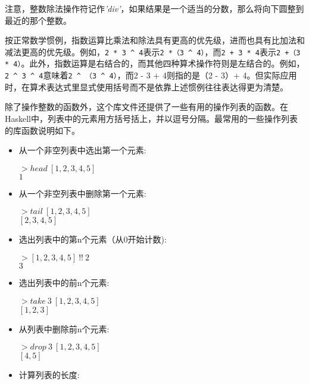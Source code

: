 注意，整数除法操作符记作\textit{'div'}，如果结果是一个适当的分数，那么将向下圆整到最近的那个整数。

按正常数学惯例，指数运算比乘法和除法具有更高的优先级，进而也具有比加法和减法更高的优先级。例如，\verb|2 * 3 ^ 4|表示\verb|2 *（3 ^ 4）|，而\verb|2 + 3 * 4|表示\verb|2 +（3 * 4）|。此外，指数运算是右结合的，而其他四种算术操作符则是左结合的。例如，\verb|2 ^ 3 ^ 4|意味着\verb|2 ^ （3 ^ 4）|，而2 - 3 + 4则指的是（2 - 3）+ 4。但实际应用时，在算术表达式里显式使用括号而不是依靠上述惯例往往表达得更为清楚。 

除了操作整数的函数外，这个库文件还提供了一些有用的操作列表的函数。在Haskell中，列表中的元素用方括号括上，并以逗号分隔。最常用的一些操作列表的库函数说明如下。

\begin{itemize}
\item 从一个非空列表中选出第一个元素:

\noindent\hspace*{1cm} $> head~[1, 2, 3, 4, 5]$\\
\hspace*{1cm} $1$

\item 从一个非空列表中删除第一个元素:

\noindent\hspace*{1cm} $> tail~[1, 2, 3, 4, 5]$\\
\hspace*{1cm} $[2, 3, 4, 5]$

\item 选出列表中的第n个元素（从0开始计数):

\noindent\hspace*{1cm} $> [1, 2, 3, 4, 5]~!!~2$\\
\hspace*{1cm} $3$

\item 选出列表中的前n个元素:

\noindent\hspace*{1cm} $> take~3~[1, 2, 3, 4, 5]$\\
\hspace*{1cm} $[1, 2, 3]$

\item 从列表中删除前n个元素:

\noindent\hspace*{1cm} $> drop~3~[1, 2, 3, 4, 5]$\\
\hspace*{1cm} $[4, 5]$

\item 计算列表的长度:


\end{itemize}
